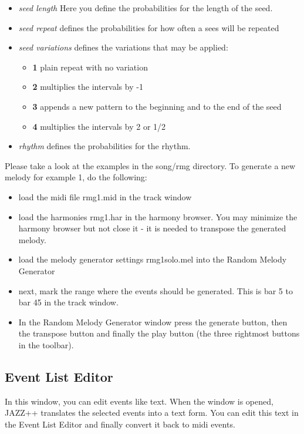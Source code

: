 \documentclass[letterpaper]{report}
\begin{document}
\begin{itemize}
\item {\em seed length} Here you define the probabilities for the length of the seed.

\item {\em seed repeat} defines the probabilities for how often a sees will be
repeated

\item {\em seed variations} defines the variations that may be applied:
\begin{itemize}
\item {\bf 1} plain repeat with no variation
\item {\bf 2} multiplies the intervals by -1
\item {\bf 3} appends a new pattern to the beginning and to the end of the seed
\item {\bf 4} multiplies the intervals by 2 or 1/2
\end{itemize}

\item {\em rhythm} defines the probabilities for the rhythm.

\end{itemize}

Please take a look at the examples in the song/rmg directory. To generate a new
melody for example 1, do the following:
\begin{itemize}
\item load the midi file rmg1.mid in the track window
\item load the harmonies rmg1.har in the harmony browser. You may minimize the
harmony browser but not close it - it is needed to transpose the generated melody.
\item load the melody generator settings rmg1solo.mel into the Random Melody Generator
\item next, mark the range where the events should be generated. This is
bar 5 to bar 45 in the track window.
\item In the Random Melody Generator window press the generate button,
then the transpose button and finally the play button (the three rightmost
buttons in the toolbar).
\end{itemize}



\subsection{Event List Editor}\label{evtlst}

In this window, you can edit events like text. When the window is opened,
JAZZ++ translates the selected events into a text form. You can edit this
text in the Event List Editor and finally convert it back to midi events.
\end{document}
